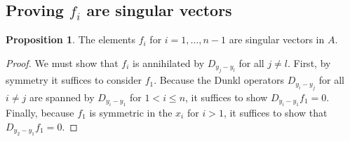 \documentclass{amsart}
\numberwithin{equation}{section}
\theoremstyle{definition}
\newtheorem{proposition}[theorem]{Proposition}
\begin{document}
\subsection{Proving $f_i$ are singular vectors} 

\begin{proposition}\label{prop:ann} 
The elements $f_i$ for $i=1,\dots,n-1$ are singular vectors in $A$.
\end{proposition}
\begin{proof}
We must show that $f_i$ is annihilated by $D_{y_j - y_l}$ for all $j \ne l$.  First, by symmetry it suffices to consider $f_1$.  Because the Dunkl operators $D_{y_i-y_j}$ for all $i \ne j$ are spanned by $D_{y_i-y_1}$ for $1< i \le n$, it suffices to show $D_{y_i - y_1} f_1 = 0$.  Finally, because $f_1$ is symmetric in the $x_i$ for $i > 1$, it suffices to show that $D_{y_2 - y_1} f_1 = 0$.


\end{proof}
\end{document}
